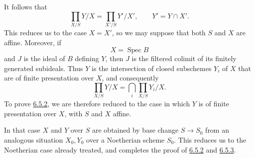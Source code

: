 It follows that
\label{eq:sga3-VIB-6.5.3-open-restriction}%
\[
  \prod_{X/S}Y/X
  =
  \prod_{X'/S}Y'/X',
  \qquad Y'=Y\cap X'.
\]
This reduces us to the case \(X=X'\), so we may suppose that both
\(S\) and \(X\) are affine. Moreover, if
\[
  X=\operatorname{Spec}B
\]
and \(J\) is the ideal of \(B\) defining \(Y\), then \(J\) is the
filtered colimit of its finitely generated subideals. Thus \(Y\)
is the intersection of closed subschemes \(Y_i\) of \(X\) that
are of finite presentation over \(X\), and consequently
\label{eq:sga3-VIB-6.5.3-finite-presentation-reduction}%
\[
  \prod_{X/S}Y/X
  =
  \bigcap_i\prod_{X/S}Y_i/X.
\]
To prove \hyperref[thm:sga3-VIB-6.5.2]{6.5.2}, we are therefore
reduced to the case in which \(Y\) is of finite presentation over
\(X\), with \(S\) and \(X\) affine.

In that case \(X\) and \(Y\) over \(S\) are obtained by base
change \(S\to S_0\) from an analogous situation \(X_0,Y_0\) over
a Noetherian scheme \(S_0\). This reduces us to the Noetherian
case already treated, and completes the proof of
\hyperref[thm:sga3-VIB-6.5.2]{6.5.2} and
\hyperref[cor:sga3-VIB-6.5.3]{6.5.3}.
